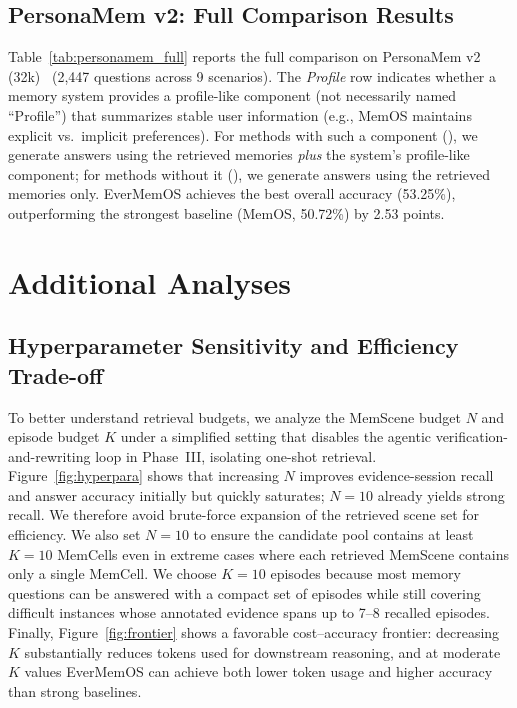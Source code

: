 \subsection{PersonaMem v2: Full Comparison Results}
\label{sec:personamem_full}


Table~\ref{tab:personamem_full} reports the full comparison on PersonaMem v2 (32k)~\cite{jiang2025personamem} (2{,}447 questions across 9 scenarios). The \textit{Profile} row indicates whether a memory system provides a profile-like component (not necessarily named ``Profile'') that summarizes stable user information (e.g., MemOS maintains explicit vs.\ implicit preferences). For methods with such a component (), we generate answers using the retrieved memories \emph{plus} the system's profile-like component; for methods without it (), we generate answers using the retrieved memories only. EverMemOS achieves the best overall accuracy (53.25\%), outperforming the strongest baseline (MemOS, 50.72\%) by 2.53 points.


\section{Additional Analyses}
\label{sec:appendix_analysis}

\subsection{Hyperparameter Sensitivity and Efficiency Trade-off}
\label{sec:sensitivity_details}
To better understand retrieval budgets, we analyze the MemScene budget \(N\) and episode budget \(K\) under a simplified setting that disables the agentic verification-and-rewriting loop in Phase~III, isolating one-shot retrieval. Figure~\ref{fig:hyperpara} shows that increasing \(N\) improves evidence-session recall and answer accuracy initially but quickly saturates; \(N{=}10\) already yields strong recall. We therefore avoid brute-force expansion of the retrieved scene set for efficiency. We also set \(N{=}10\) to ensure the candidate pool contains at least \(K{=}10\) MemCells even in extreme cases where each retrieved MemScene contains only a single MemCell. We choose \(K{=}10\) episodes because most memory questions can be answered with a compact set of episodes while still covering difficult instances whose annotated evidence spans up to 7--8 recalled episodes. Finally, Figure~\ref{fig:frontier} shows a favorable cost--accuracy frontier: decreasing \(K\) substantially reduces tokens used for downstream reasoning, and at moderate \(K\) values EverMemOS can achieve both lower token usage and higher accuracy than strong baselines.

